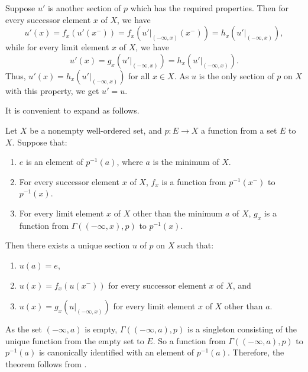 \documentclass{article}
\begin{document}
Suppose \(u'\) is another section of \(p\) which has the required
properties.  Then for every successor element \(x\) of \(X\), we have
\begin{displaymath}
  u'(x) =
  f_x(u'(x^-)) =
  f_x(u' \vert_{(-\infty, x)}(x^-)) =
  h_x(u' \vert_{(-\infty, x)}),
\end{displaymath}
while for every limit element \(x\) of \(X\), we have
\begin{displaymath}
  u'(x) = g_x(u' \vert_{(-\infty, x)}) = h_x(u' \vert_{(-\infty, x)}).
\end{displaymath}
Thus, \(u'(x) = h_x(u' \vert_{(-\infty, x)})\) for all \(x \in X\).
As \(u\) is the only section of \(p\) on \(X\) with this property, we
get \(u' = u\).

It is convenient to expand  as follows.

\begin{theorem}
  \label{thm:hpleq0rr}
  Let \(X\) be a nonempty well-ordered set, and \(p : E \to X\) a
  function from a set \(E\) to \(X\).  Suppose that:
  \begin{enumerate}
  \item \(e\) is an element of \(p^{-1}(a)\), where \(a\) is the
    minimum of \(X\).
  \item For every successor element \(x\) of \(X\), \(f_x\) is a
    function from \(p^{-1}(x^-)\) to \(p^{-1}(x)\).
  \item For every limit element \(x\) of \(X\) other than the minimum
    \(a\) of \(X\), \(g_x\) is a function from
    \(\Gamma((-\infty, x), p)\) to \(p^{-1}(x)\).
  \end{enumerate}
  Then there exists a unique section \(u\) of \(p\) on \(X\) such
  that:
  \begin{enumerate}
  \item \(u(a) = e\),
  \item \(u(x) = f_x(u(x^-))\) for every successor element \(x\) of
    \(X\), and
  \item \(u(x) = g_x(u \vert_{(-\infty, x)})\) for every limit element
    \(x\) of \(X\) other than \(a\).
  \end{enumerate}
\end{theorem}

As the set \((-\infty, a)\) is empty, \(\Gamma((-\infty, a), p)\) is a
singleton consisting of the unique function from the empty set to
\(E\).  So a function from \(\Gamma((-\infty, a), p)\) to
\(p^{-1}(a)\) is canonically identified with an element of
\(p^{-1}(a)\).  Therefore, the theorem follows from
.
\end{document}
